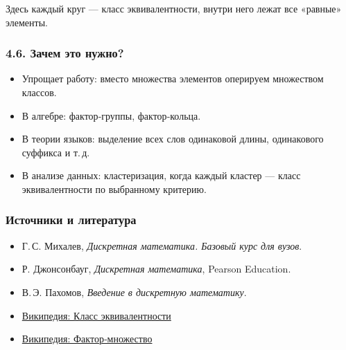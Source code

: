 Здесь каждый круг — класс эквивалентности, внутри него лежат все «равные» элементы.

\subsubsection{4.6. Зачем это нужно?}

\begin{itemize}[leftmargin=*]
  \item Упрощает работу: вместо множества элементов оперируем множеством классов.
  \item В алгебре: фактор‑группы, фактор‑кольца.
  \item В теории языков: выделение всех слов одинаковой длины, одинакового суффикса и т.\,д.
  \item В анализе данных: кластеризация, когда каждый кластер — класс эквивалентности по выбранному критерию.
\end{itemize}

\subsubsection{Источники и литература}

\begin{itemize}
  \item Г.\,С. Михалев, \emph{Дискретная математика. Базовый курс для вузов}.
  \item Р. Джонсонбауг, \emph{Дискретная математика}, Pearson Education.
  \item В.\,Э. Пахомов, \emph{Введение в дискретную математику}.
  \item \href{https://ru.wikipedia.org/wiki/Класс_эквивалентности}{Википедия: Класс эквивалентности}
  \item \href{https://ru.wikipedia.org/wiki/Фактор-множество}{Википедия: Фактор‑множество}
\end{itemize}